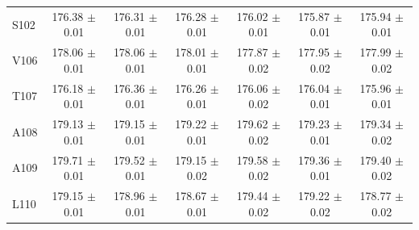 \documentclass[%
 aip,
 amsmath,amssymb,
 preprint,%
]{revtex4-1}
\begin{document}
\begin{center}
\begin{longtable}{l|c|c|c|c|c|c}
S102 & 176.38 $\pm$ 0.01 & 176.31 $\pm$ 0.01 & 176.28 $\pm$ 0.01 & 176.02 $\pm$ 0.01 & 175.87 $\pm$ 0.01 & 175.94 $\pm$ 0.01 \\
V106 & 178.06 $\pm$ 0.01 & 178.06 $\pm$ 0.01 & 178.01 $\pm$ 0.01 & 177.87 $\pm$ 0.02 & 177.95 $\pm$ 0.02 & 177.99 $\pm$ 0.02 \\
T107 & 176.18 $\pm$ 0.01 & 176.36 $\pm$ 0.01 & 176.26 $\pm$ 0.01 & 176.06 $\pm$ 0.02 & 176.04 $\pm$ 0.01 & 175.96 $\pm$ 0.01 \\
A108 & 179.13 $\pm$ 0.01 & 179.15 $\pm$ 0.01 & 179.22 $\pm$ 0.01 & 179.62 $\pm$ 0.02 & 179.23 $\pm$ 0.01 & 179.34 $\pm$ 0.02 \\
A109 & 179.71 $\pm$ 0.01 & 179.52 $\pm$ 0.01 & 179.15 $\pm$ 0.02 & 179.58 $\pm$ 0.02 & 179.36 $\pm$ 0.01 & 179.40 $\pm$ 0.02 \\
L110 & 179.15 $\pm$ 0.01 & 178.96 $\pm$ 0.01 & 178.67 $\pm$ 0.01 & 179.44 $\pm$ 0.02 & 179.22 $\pm$ 0.02 & 178.77 $\pm$ 0.02 \\
\end{longtable}
\end{center}
\endgroup
\end{document}

